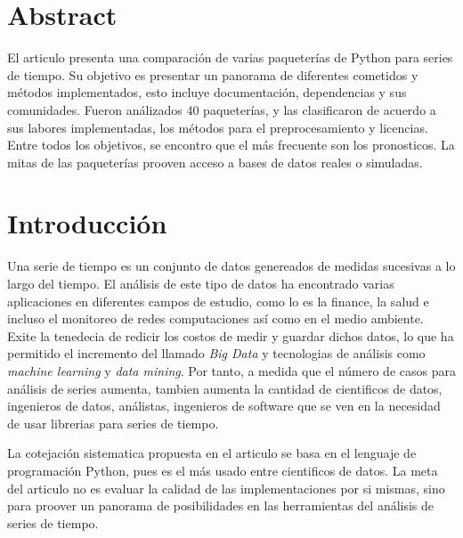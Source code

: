 \documentclass[a4paper, 11pt]{article}
\begin{document}
	\setlength{\parskip}{\medskipamount}
	\setlength{\parindent}{0pt}
\section*{Abstract}

El articulo presenta una comparación de varias paqueterías de Python para series de tiempo. Su objetivo es presentar un panorama de diferentes cometidos y métodos implementados, esto incluye documentación, dependencias y sus comunidades. Fueron análizados 40 paqueterías, y las clasificaron de acuerdo a sus labores implementadas, los métodos para el preprocesamiento y licencias. Entre todos los objetivos, se encontro que el más frecuente son los pronosticos. La mitas de las paqueterías prooven acceso a bases de datos reales o simuladas.


\section{Introducción}

Una serie de tiempo es un conjunto de datos genereados de medidas sucesivas a lo largo del tiempo. El análisis de este tipo de datos ha encontrado varias aplicaciones en diferentes campos de estudio, como lo es la finance, la salud e incluso el monitoreo de redes computaciones así como en el medio ambiente. Exite la tenedecia de redicir los costos de medir y guardar dichos datos, lo que ha permitido el incremento del llamado \textit{Big Data} y tecnologias de análisis como \textit{machine learning} y \textit{data mining}. Por tanto, a medida que el número de casos para análisis de series aumenta, tambien aumenta la cantidad de cientificos de datos, ingenieros de datos, análistas, ingenieros de software que se ven en la necesidad de usar librerias para series de tiempo.

La cotejación sistematica propuesta en el articulo se basa en el lenguaje de programación Python, pues es el más usado entre cientificos de datos. La meta del articulo no es evaluar la calidad de las implementaciones por si mismas, sino para proover un panorama de posibilidades en las herramientas del análisis de series de tiempo.
\end{document}
